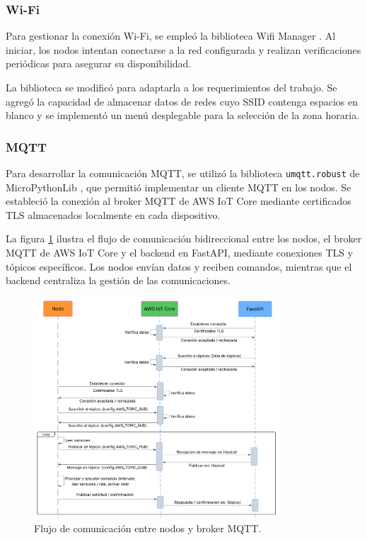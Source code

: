 \subsubsection{Wi-Fi}

Para gestionar la conexión Wi-Fi, se empleó la biblioteca Wifi Manager
\cite{MicroPythonWifiManager}. Al iniciar, los nodos intentan conectarse a la
red configurada y realizan verificaciones periódicas para asegurar su
disponibilidad.

La biblioteca se modificó para adaptarla a los requerimientos del trabajo. Se
agregó la capacidad de almacenar datos de redes cuyo SSID contenga espacios en
blanco y se implementó un menú desplegable para la selección de la zona
horaria.

\subsubsection{MQTT}

Para desarrollar la comunicación MQTT, se utilizó la biblioteca
\texttt{umqtt.robust} de MicroPythonLib \cite{MicropythonLib}, que permitió
implementar un cliente MQTT en los nodos. Se estableció la conexión al broker
MQTT de AWS IoT Core mediante certificados TLS almacenados localmente en cada
dispositivo.

La figura \ref{fig:secuencia_mqtt} ilustra el flujo de comunicación
bidireccional entre los nodos, el broker MQTT de AWS IoT Core y el backend en
FastAPI, mediante conexiones TLS y tópicos específicos. Los nodos envían datos
y reciben comandos, mientras que el backend centraliza la gestión de las
comunicaciones.

\begin{figure}[H]
    \centering
    \includegraphics[width=0.82\textwidth]{./Images/31_secuencia_mqtt.png}
    \caption{Flujo de comunicación entre nodos y broker MQTT.}
    \label{fig:secuencia_mqtt}
\end{figure}

